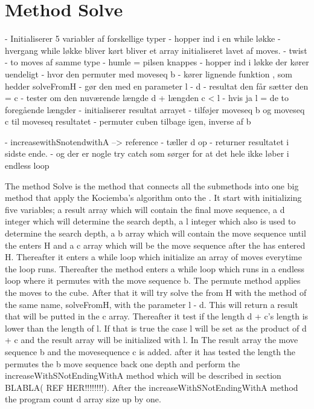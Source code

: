 \section{Method Solve}

- Initialiserer 5 variabler af forskellige typer
- hopper ind i en while l\o{}kke
- hvergang while l\o{}kke bliver k\o{}rt bliver et array initialiseret lavet af moves.
- twist
- to moves af samme type
-  humle = pilsen knappes
- hopper ind i l\o{}kke der k\o{}rer uendeligt
- hvor den permuter med moveseq b
- k\o{}rer lignende funktion , som hedder solveFromH
- g\o{}r den med en parameter l - d
- resultat den f\aa{}r s\ae{}tter den = c
- tester om den nuv\ae{}rende l\ae{}ngde d + l\ae{}ngden c < l
- hvis ja l = de to foreg\aa{}ende l\ae{}ngder
- initialiserer resultat arrayet
- tilf\o{}jer moveseq b og moveseq c til moveseq resultatet
- permuter cuben tilbage igen, inverse af b

- increasewithSnotendwithA --> reference
- t\ae{}ller d op
- returner resultatet i sidste ende.
-  og der er nogle try catch som s\o{}rger for at det hele ikke l\o{}ber i endless loop

The method Solve is the method that connects all the submethods into one big method that apply the Kociemba's algorithm onto the \rubik{}. It start with initializing five variables; a result array which will contain the final move sequence, a d integer which will determine the search depth, a l integer which also is used to determine the search depth, a b array which will contain the move sequence until the \rubik{} enters H and a c array which will be the move sequence after the \rubik{} has entered H. Thereafter it enters a while loop which initialize an array of moves everytime the loop runs. Thereafter the method enters a while loop which runs in a endless loop where it permutes with the move sequence b. The permute method applies the moves to the cube. After that it will try solve the \rubik{} from H with the method of the same name, solveFromH, with the parameter l - d.  This will return a result that will be putted in the c array. Thereafter it test if the length d + c's length is lower than the length of l. If that is true the case l will be set as the product of d + c and the result array will be initialized with l. In The result array the move sequence b and the movesequence c is added. after it has tested the length the \rubik{}  permutes the b move sequence back one depth and perform the increaseWithSNotEndingWithA method which will be described in section BLABLA( REF HER!!!!!!!!). After the increaseWithSNotEndingWithA method the program count d array size up by one.


